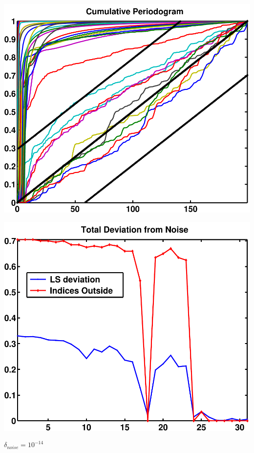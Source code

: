 \documentclass[11pt]{amsart}
\begin{document}
	\vspace{5mm}
	\begin{minipage}[t]{0.5\textwidth}
	
		\includegraphics[width=.95\linewidth]{figures/run1/cum_per} 
   
	\end{minipage}
	\begin{minipage}[t]{0.5\textwidth}
	
		\includegraphics[width=.95\linewidth]{figures/run1/total_deviation} 
  
	\end{minipage}
{\centering $\delta_{noise}=10^{-14}$}
\end{document}
